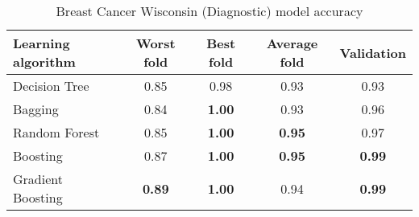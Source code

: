 \begin{table}[htbp]
    \centering
    \begin{tabular}{l c c c c}
    \toprule
    Learning algorithm  & Worst fold     & Best fold     & Average fold  & Validation    \\
    \midrule
    Decision Tree       &  0.85          & 0.98          & 0.93          & 0.93          \\
    Bagging             &  0.84          & \textbf{1.00} & 0.93          & 0.96          \\
    Random Forest       &  0.85          & \textbf{1.00} & \textbf{0.95} & 0.97          \\
    Boosting            &  0.87          & \textbf{1.00} & \textbf{0.95} & \textbf{0.99} \\
    Gradient Boosting   &  \textbf{0.89} & \textbf{1.00} & 0.94          & \textbf{0.99} \\
    \bottomrule
    \end{tabular}
    \caption{Breast Cancer Wisconsin (Diagnostic) model accuracy}
\end{table}